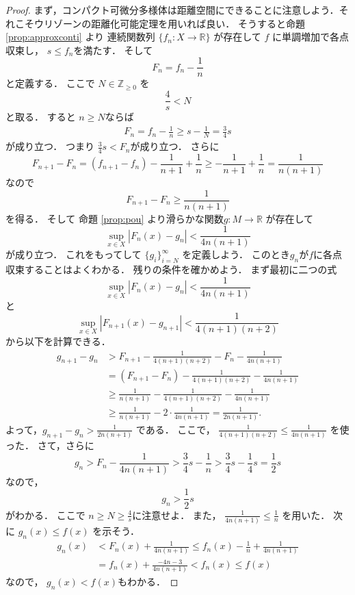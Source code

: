 \documentclass[leqno, a4paper, 12pt, dvipdfmx]{jsarticle}
\newcommand{\zz}{\mathbb{Z}}
\newcommand{\rr}{\mathbb{R}}
\begin{document}
\begin{proof}
まず，コンパクト可微分多様体は距離空間にできることに注意しよう．それこそウリゾーンの距離化可能定理を用いれば良い．
そうすると命題
\ref{prop:approxconti}
より
連続関数列
$\{f_{n}\colon X\to \rr\}$
が存在して
$f$
に単調増加で各点収束し，
$s\le f_{n}$を満たす．
そして
\[
F_{n}=f_{n}-\frac{1}{n}
\]
と定義する．
ここで
$N\in \zz_{\ge 0}$
を
\[
\frac{4}{s}<N
\]
と取る．
すると
$n\ge N$ならば
\begin{align*}
F_{n}=f_{n}-\frac{1}{n}\ge s-\frac{1}{N}
=\frac{3}{4}s
\end{align*}
が成り立つ．
つまり
$\frac{3}{4}s<F_{n}$が成り立つ．
さらに
\[
F_{n+1}-F_{n}
=(f_{n+1}-f_{n})-\frac{1}{n+1}+\frac{1}{n}
\ge -\frac{1}{n+1}+\frac{1}{n}=\frac{1}{n(n+1)}
\]
なので
\[
F_{n+1}-F_{n}\ge \frac{1}{n(n+1)}
\]
を得る．
そして
命題
\ref{prop:pou}
より滑らかな関数$g\colon M\to \rr$
が存在して
\[
\sup_{x\in X}|F_{n}(x)-g_{n}|<\frac{1}{4n(n+1)}
\]
が成り立つ．
これをもってして
$\{g_{i}\}_{i=N}^{\infty}$
を定義しよう．
このとき$g_{n}$が$f$に各点収束することはよくわかる．
残りの条件を確かめよう．
まず最初に二つの式
\[
\sup_{x\in X}|F_{n}(x)-g_{n}|<\frac{1}{4n(n+1)}
\]
と
\[
\sup_{x\in X}|F_{n+1}(x)-g_{n+1}|<\frac{1}{4(n+1)(n+2)}
\]
から以下を計算できる．
\begin{align*}
g_{n+1}-g_{n}&>
F_{n+1}-\frac{1}{4(n+1)(n+2)}-F_{n}-\frac{1}{4n(n+1)}\\
&=(F_{n+1}-F_{n})-\frac{1}{4(n+1)(n+2)}-\frac{1}{4n(n+1)}
\\
&\ge \frac{1}{n(n+1)}-\frac{1}{4(n+1)(n+2)}-\frac{1}{4n(n+1)}
\\
&
\ge \frac{1}{n(n+1)}-2\cdot \frac{1}{4n(n+1)}
=\frac{1}{2n(n+1)}. 
\end{align*}
よって，$g_{n+1}-g_{n}>\frac{1}{2n(n+1)}$
である．
ここで，
$\frac{1}{4(n+1)( n+2)}\le \frac{1}{4n(n+1)}$
を使った．
さて，さらに
\[
g_{n}>F_{n}-\frac{1}{4n(n+1)}
>\frac{3}{4}s-\frac{1}{n}>\frac{3}{4}s-\frac{1}{4}s
=\frac{1}{2}s
\]
なので，
\[
g_{n}>\frac{1}{2}s
\]
がわかる．
ここで
$n\ge N\ge \frac{4}{s}$に注意せよ．
また，
$\frac{1}{4n(n+1)}\le \frac{1}{n}$
を用いた．
次に
$g_{n}(x)\le f(x)$
を示そう．
\begin{align*}
g_{n}(x)&< F_{n}(x)+\frac{1}{4n(n+1)}
\le f_{n}(x)-\frac{1}{n}+\frac{1}{4n(n+1)}\\
&
=f_{n}(x)+\frac{-4n-3}{4n(n+1)}
< f_{n}(x)\le f(x)
\end{align*}
なので，
$g_{n}(x)< f(x)$もわかる．
\end{proof}
\end{document}
